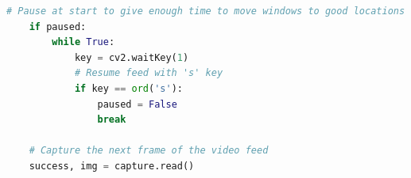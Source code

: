 \documentclass[10pt,conference]{IEEEtran}
\begin{document}
\begin{lstlisting}[language=Python,basicstyle=\tiny, showspaces=false, showstringspaces=false tabsize=1, breaklines=true]
    # Pause at start to give enough time to move windows to good locations
    if paused:
        while True:
            key = cv2.waitKey(1)
            # Resume feed with 's' key
            if key == ord('s'):
                paused = False
                break
    
    # Capture the next frame of the video feed
    success, img = capture.read()    
\end{lstlisting}
\end{document}
